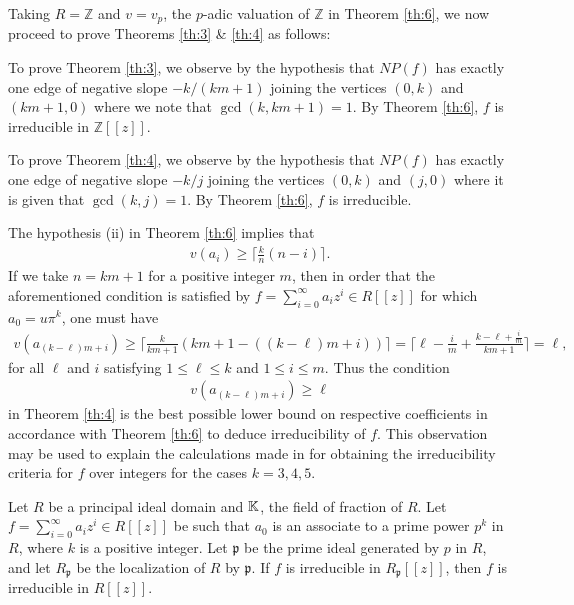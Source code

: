\documentclass[12pt,reqno]{amsart}%
\begin{document}
Taking $R=\mathbb{Z}$ and $v=v_p$, the $p$-adic valuation of $\mathbb{Z}$ in Theorem \ref{th:6}, we now proceed to prove Theorems \ref{th:3} \& \ref{th:4} as follows:

To prove Theorem \ref{th:3}, we observe by the hypothesis that $NP(f)$ has exactly one edge of negative slope $-k/(km+1)$ joining the vertices $(0,k)$ and $(km+1,0)$ where we note that $\gcd(k,km+1)=1$. By Theorem \ref{th:6}, $f$ is irreducible in $\mathbb{Z}[[z]]$.

To prove Theorem \ref{th:4}, we observe by the hypothesis that $NP(f)$ has exactly one edge of negative slope $-k/j$ joining the vertices $(0,k)$ and $(j,0)$ where it is given that $\gcd(k,j)=1$. By Theorem \ref{th:6}, $f$ is irreducible.
\begin{remark}
 The hypothesis (ii) in Theorem \ref{th:6} implies that
\begin{eqnarray*}
v(a_i)\geq \Big\lceil \frac{k}{n}(n-i) \Big\rceil.
\end{eqnarray*}
 If we take $n=km+1$ for a positive integer $m$, then in order that the aforementioned condition is satisfied by $f=\sum_{i=0}^\infty a_i z^i\in R[[z]]$ for which $a_0=u\pi^k$, one must have
\begin{eqnarray*}
v(a_{(k-\ell)m+i})\geq \Big\lceil \frac{k}{km+1}(km+1-((k-\ell)m+i)) \Big\rceil=\Big\lceil \ell-\frac{i}{m}+\frac{k-\ell+\frac{i}{m}}{km+1} \Big \rceil=\ell,
\end{eqnarray*}
for all $\ell$ and $i$ satisfying $1\leq \ell\leq k$ and $1\leq i\leq m$. Thus the condition
\begin{eqnarray*}
v(a_{(k-\ell)m+i})\geq \ell
\end{eqnarray*}
in Theorem \ref{th:4}  is the best possible lower bound on respective coefficients in accordance with Theorem \ref{th:6} to deduce irreducibility of $f$. This observation may be used to explain the calculations made in \cite{Dutta2024} for obtaining the irreducibility criteria for  $f$ over integers for the cases $k=3,4,5$.
\end{remark}
\begin{lemma}\label{L:1}
 Let $R$ be a principal ideal domain and $\mathbb{K}$, the field of fraction of $R$. Let  $f=\sum_{i=0}^\infty a_i z^i \in R[[z]]$ be such that $a_0$ is an associate to a prime power $p^k$ in $R$, where $k$ is a positive integer. Let $\mathfrak{p}$ be the prime ideal generated by $p$ in $R$, and let $R_{\mathfrak{p}}$ be the localization of $R$ by $\mathfrak{p}$. If $f$ is irreducible in $R_{\mathfrak{p}}[[z]]$, then $f$ is irreducible in $R[[z]]$.
\end{lemma}
\end{document}

